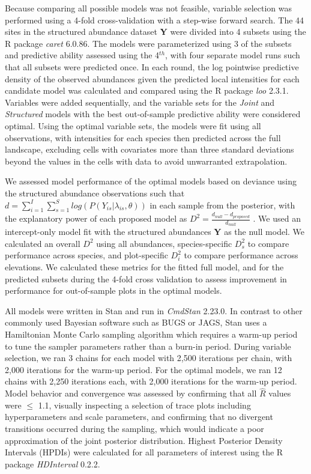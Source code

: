 \documentclass[preprint,review,times,12pt,3p]{elsarticle}
\begin{document}
Because comparing all possible models was not feasible, variable selection was performed using a 4-fold cross-validation with a step-wise forward search. The 44 sites in the structured abundance dataset \textbf{Y} were divided into 4 subsets using the R package \emph{caret} 6.0.86. The models were parameterized using 3 of the subsets and predictive ability assessed using the 4$^{th}$, with four separate model runs such that all subsets were predicted once. In each round, the log pointwise predictive density of the observed abundances given the predicted local intensities for each candidate model was calculated and compared using the R package \emph{loo} 2.3.1. Variables were added sequentially, and the variable sets for the \emph{Joint} and \emph{Structured} models with the best out-of-sample predictive ability were considered optimal. Using the optimal variable sets, the models were fit using all observations, with intensities for each species then predicted across the full landscape, excluding cells with covariates more than three standard deviations beyond the values in the cells with data to avoid unwarranted extrapolation.

We assessed model performance of the optimal models based on deviance using the structured abundance observations such that $d = \sum_{i=1}^{I}\sum_{s=1}^S log(P(Y_{is} | \lambda_{is}, \theta))$ in each sample from the posterior, with the explanatory power of each proposed model as $D^2 = \frac{d_{null} - d_{proposed}}{d_{null}}$ \citep{Caradima2019,Guisan2000}. We used an intercept-only model fit with the structured abundances \textbf{Y} as the null model. We calculated an overall $D^2$ using all abundances, species-specific $D^2_s$ to compare performance across species, and plot-specific $D^2_i$ to compare performance across elevations. We calculated these metrics for the fitted full model, and for the predicted subsets during the 4-fold cross validation to assess improvement in performance for out-of-sample plots in the optimal models.

All models were written in Stan \citep{Carpenter2017} and run in \emph{CmdStan} 2.23.0. In contrast to other commonly used Bayesian software such as BUGS or JAGS, Stan uses a Hamiltonian Monte Carlo sampling algorithm which requires a warm-up period to tune the sampler parameters rather than a burn-in period. During variable selection, we ran 3 chains for each model with 2,500 iterations per chain, with 2,000 iterations for the warm-up period. For the optimal models, we ran 12 chains with 2,250 iterations each, with 2,000 iterations for the warm-up period. Model behavior and convergence was assessed by confirming that all $\hat{R}$ values were $\leq$ 1.1, visually inspecting a selection of trace plots including hyperparameters and scale parameters, and confirming that no divergent transitions occurred during the sampling, which would indicate a poor approximation of the joint posterior distribution. Highest Posterior Density Intervals (HPDIs) were calculated for all parameters of interest using the R package \emph{HDInterval} 0.2.2.
\end{document}
